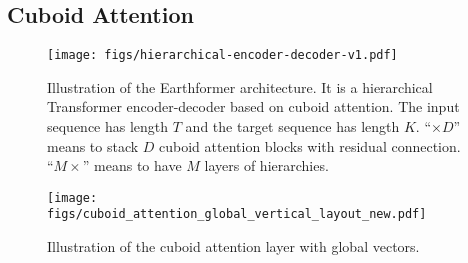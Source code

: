 \documentclass{article}
\begin{document}
\subsection{Cuboid Attention}



\begin{figure}[!tb]
    \centering
    \begin{minipage}{0.55\textwidth}
\hspace*{-0.5cm}
        \centering
\texttt{[image: figs/hierarchical-encoder-decoder-v1.pdf]}
        \caption{Illustration of the Earthformer architecture. It is a hierarchical Transformer encoder-decoder based on cuboid attention. The input sequence has length $T$ and the target sequence has length $K$. ``$\times D$'' means to stack $D$ cuboid attention blocks with residual connection. ``$M\times$'' means to have $M$ layers of hierarchies.} 
        \label{fig:enc_dec}
\end{minipage}
     \hspace*{0.5cm}
    \begin{minipage}{0.4\textwidth}
\centering
\texttt{[image: figs/cuboid\_attention\_global\_vertical\_layout\_new.pdf]}
\caption{Illustration of the cuboid attention layer with global vectors.}
        \label{fig:cuboid_attention}
\end{minipage}
\vspace{-1em}
\end{figure}
\end{document}
